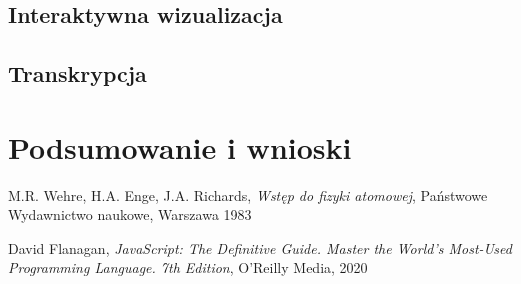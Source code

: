 \documentclass{SGGW-thesis}
\begin{document}
	\section{Interaktywna wizualizacja}
	\section{Transkrypcja}
	
\chapter{Podsumowanie i wnioski}


\begin{thebibliography}{9}
	M.R. Wehre, H.A. Enge, J.A. Richards,
	\textit{Wstęp do fizyki atomowej}, 
	Państwowe Wydawnictwo naukowe, Warszawa 1983
	
	David Flanagan, 
	\textit{JavaScript: The Definitive Guide. Master the World's Most-Used Programming Language. 7th Edition}, 
	O'Reilly Media, 2020
	
	
\end{thebibliography}

\beforelastpage
\end{document}
